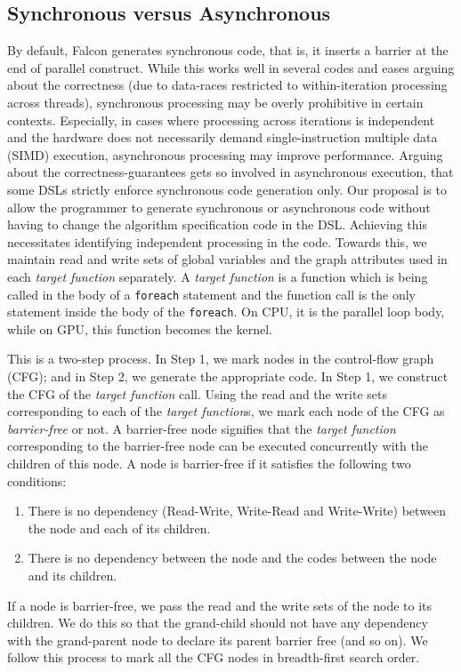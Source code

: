 \subsection{Synchronous versus Asynchronous}\label{sec:syncasync}
By default, Falcon generates synchronous code, that is, it inserts a barrier at the end of parallel construct. 
While this works well in several codes and eases arguing about the correctness (due to data-races restricted to within-iteration processing across threads), synchronous processing may be overly prohibitive in certain contexts.
Especially, in cases where processing across iterations is independent and the hardware does not necessarily demand single-instruction multiple data (SIMD) execution, asynchronous processing may improve performance.
Arguing about the correctness-guarantees gets so involved in asynchronous execution, that some DSLs strictly enforce synchronous code generation only.
Our proposal is to allow the programmer to generate synchronous or asynchronous code without having to change the algorithm specification code in the DSL.
Achieving this necessitates identifying independent processing in the code. 
Towards this, we maintain read and write sets of global variables and the graph attributes used in each \textit{target function} separately. A \textit{target function} is a function which is being called in the body of a \texttt{foreach} statement and the function call is the only statement inside the body of the \texttt{foreach}.  On CPU, it is the parallel loop body, while on GPU, this function becomes the kernel.

This is a two-step process. In Step 1, we mark nodes in the control-flow graph (CFG); and in Step 2, we generate the appropriate code.
In Step 1, we construct the CFG of the \textit{target function} call.
Using the read and the write sets corresponding to each of the \textit{target function}s, we mark each node of the CFG as \textit{barrier-free} or not. A barrier-free node signifies that the \textit{target function} corresponding to the barrier-free node can be executed concurrently with the children of this node.
A node is barrier-free if it satisfies the following two conditions:
\begin{enumerate}
\item There is no dependency (Read-Write, Write-Read and Write-Write) between the node and each of its children. 
\item There is no dependency between the node and the codes between the node and its children.
\end{enumerate}
If a node is barrier-free, we pass the read and the write sets of the node to its children. 
We do this so that the grand-child should not have any dependency with the grand-parent node to declare its parent barrier free (and so on).
We follow this process to mark all the CFG nodes in breadth-first search order.

